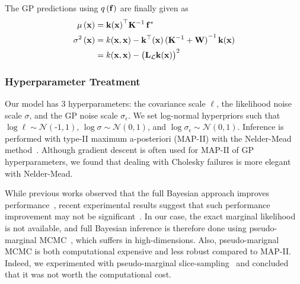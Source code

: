 The GP predictions using \(q\,(\mathbf{f})\) are finally given as
\begin{align}
  \mu\,(\mathbf{x})
  &= {\mathbf{k}(\mathbf{x})}^{\top} \mathbf{K}^{-1} \, \mathbf{f}^*  \\
  \sigma^2\,(\mathbf{x})
  &= k(\mathbf{x}, \mathbf{x}) - \mathbf{k}^{\top}(\mathbf{x}) \, {(\mathbf{K}^{-1} + \mathbf{W})}^{-1} \, \mathbf{k}(\mathbf{x}) \\
  &= k(\mathbf{x}, \mathbf{x}) - {\big( \mathbf{L}_{\mathcal{L}} \mathbf{k}(\mathbf{x}) \big)}^2
\end{align}

\subsubsection{Hyperparameter Treatment}
Our model has 3 hyperparameters: the covariance scale \(\ell\), the likelihood noise scale \(\sigma\), and the GP noise scale \(\sigma_\epsilon\).
We set log-normal hyperpriors such that \(\log \ell \sim \mathcal{N}\left(\text{-}1, 1\right)\), \(\log \sigma \sim \mathcal{N}\left(0, 1\right)\), and \(\log \sigma_{\epsilon} \sim \mathcal{N}\left(0, 1\right)\).
Inference is performed with type-II maximum a-posteriori (MAP-II) with the Nelder-Mead method~\cite{nelder_simplex_1965}.
Although gradient descent is often used for MAP-II of GP hyperparameters, we found that dealing with Cholesky failures is more elegant with Nelder-Mead.

While previous works observed that the full Bayesian approach improves performance~\cite{henrandez-lobato_predictive_2014, snoek_practical_2012}, recent experimental results suggest that such performance improvement may not be significant~\cite{ath_bayesian_2021}.
In our case, the exact marginal likelihood is not available, and full Bayesian inference is therefore done using pseudo-marginal MCMC~\cite{filippone_pseudomarginal_2014, pmlr-v51-murray16}, which suffers in high-dimensions.
Also, pseudo-marignal MCMC is both computational expensive and less robust compared to MAP-II.
Indeed, we experimented with pseudo-marginal slice-sampling~\cite{pmlr-v51-murray16} and concluded that it was not worth the computational cost.



